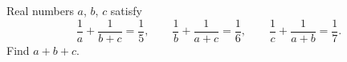 Real numbers $a$, $b$, $c$ satisfy
\[\dfrac1a+\dfrac1{b+c}=\dfrac15,\qquad\dfrac1b+\dfrac1{a+c}=\dfrac16,\qquad\dfrac1c+\dfrac1{a+b}=\dfrac17.\]
Find $a+b+c$.
